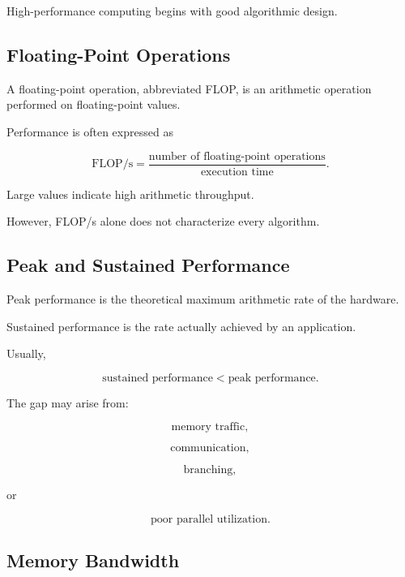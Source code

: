 High-performance computing begins with good algorithmic design.

\subsection{Floating-Point Operations}
\label{subsec:hpmc-flops}

A floating-point operation, abbreviated FLOP, is an arithmetic operation
performed on floating-point values.

Performance is often expressed as

\[
\boxed{
\text{FLOP/s}
=
\frac{
\text{number of floating-point operations}
}{
\text{execution time}
}.
}
\]

Large values indicate high arithmetic throughput.

However, FLOP/s alone does not characterize every algorithm.

\subsection{Peak and Sustained Performance}
\label{subsec:peak-sustained-performance}

Peak performance is the theoretical maximum arithmetic rate of the
hardware.

Sustained performance is the rate actually achieved by an application.

Usually,

\[
\boxed{
\text{sustained performance}
<
\text{peak performance}.
}
\]

The gap may arise from:

\[
\boxed{
\text{memory traffic},
}
\]

\[
\boxed{
\text{communication},
}
\]

\[
\boxed{
\text{branching},
}
\]

or

\[
\boxed{
\text{poor parallel utilization}.
}
\]

\subsection{Memory Bandwidth}
\label{subsec:hpmc-memory-bandwidth}

